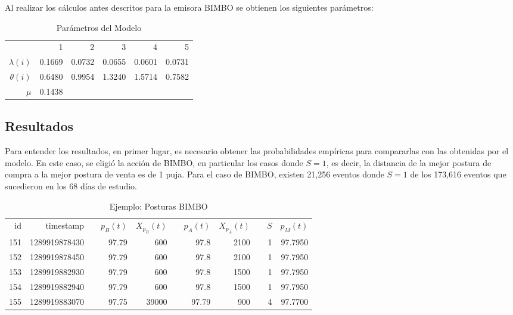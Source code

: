 \documentclass[11pt]{article}
\numberwithin{equation}{section} %
\begin{document}
Al realizar los cálculos antes descritos para la emisora BIMBO se obtienen los siguientes parámetros:

\begin{table}[htbp]
\centering
\caption{Parámetros del Modelo}
\begin{tabular}{r|r|r|r|r|r|}
\cline{2-6}
& 1& 2 & 3 & 4 & 5 \\
\cline{2-6}
$\lambda(i)$ & 0.1669 & 0.0732 & 0.0655 & 0.0601 & 0.0731 \\
$\theta(i)$ & 0.6480 & 0.9954 & 1.3240 & 1.5714 & 0.7582 \\
\cline{2-6}
$\mu$ & 0.1438 & & & & \\
\cline{2-6}
\end{tabular}%
\label{tab:paremeters}%
\end{table}%

\subsection{Resultados}

Para entender los resultados, en primer lugar, es necesario obtener las probabilidades empíricas para compararlas con las obtenidas por el modelo. En este caso, se eligió la acción de BIMBO, en particular los casos donde $S=1$, es decir, la distancia de la mejor postura de compra a la mejor postura de venta es de 1 puja. Para el caso de BIMBO, existen 21,256 eventos donde $S=1$ de los 173,616 eventos que sucedieron en los 68 días de estudio.

\begin{table}[htbp]
  \centering
  \caption{Ejemplo: Posturas BIMBO}
    \begin{tabular}{rrrrrrrrrrr}
    id    & timestamp &       & $p_B(t)$    & $X_{p_B}(t)$ &       & $p_A(t)$    & $X_{p_A}(t)$   &       & $S$     & $p_M(t)$ \\
    151   & 1289919878430 &       & 97.79 & 600   &       & 97.8  & 2100  &       & 1  & 97.7950 \\
    152   & 1289919878450 &       & 97.79 & 600   &       & 97.8  & 2100  &       & 1  & 97.7950 \\
    153   & 1289919882930 &       & 97.79 & 600   &       & 97.8  & 1500  &       & 1  & 97.7950 \\
    154   & 1289919882940 &       & 97.79 & 600   &       & 97.8  & 1500  &       & 1  & 97.7950 \\
    155   & 1289919883070 &       & 97.75 & 39000 &       & 97.79 & 900   &       & 4  & 97.7700 \\
    \end{tabular}%
  \label{tab:bimbotab}%
\end{table}%
\end{document}
